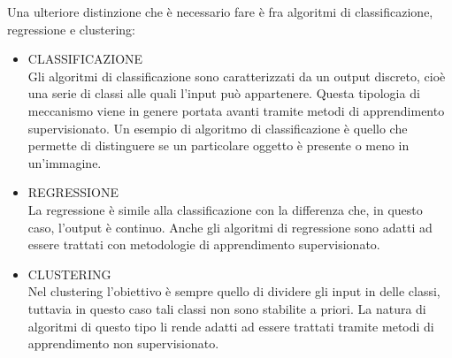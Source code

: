 Una ulteriore distinzione che è necessario fare è fra algoritmi di classificazione, regressione e clustering:
\begin{itemize}
	\item CLASSIFICAZIONE \\
	Gli algoritmi di classificazione sono caratterizzati da un output discreto, cioè una serie di classi alle quali l'input può appartenere. Questa tipologia di meccanismo viene in genere portata avanti tramite metodi di apprendimento supervisionato. Un esempio di algoritmo di classificazione è quello che permette di distinguere se un particolare oggetto è presente o meno in un'immagine.
	\item REGRESSIONE \\
	La regressione è simile alla classificazione con la differenza che, in questo caso, l'output è continuo. Anche gli algoritmi di regressione sono adatti ad essere trattati con metodologie di apprendimento supervisionato.
	\item CLUSTERING \\
	Nel clustering l'obiettivo è sempre quello di dividere gli input in delle classi, tuttavia in questo caso tali classi non sono stabilite a priori. La natura di algoritmi di questo tipo li rende adatti ad essere trattati tramite metodi di apprendimento non supervisionato.
\end{itemize}

